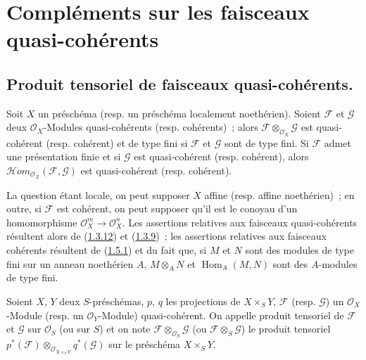 \section{Compléments sur les faisceaux quasi-cohérents}
\label{section:I.9-fr}

\subsection{Produit tensoriel de faisceaux quasi-cohérents.}
\label{subsection:I.9.1-fr}

\begin{proposition}[9.1.1]
\label{I.9.1.1-fr}
Soit $X$ un préschéma (resp. un préschéma localement noethérien). Soient
$\mathscr{F}$ et $\mathscr{G}$ deux $\mathscr{O}_X$-Modules quasi-cohérents
(resp. cohérents)~; alors
$\mathscr{F}\otimes_{\mathscr{O}_X}\mathscr{G}$ est quasi-cohérent (resp.
cohérent) et de type fini si $\mathscr{F}$ et $\mathscr{G}$ sont de type
fini. Si $\mathscr{F}$ admet une présentation finie et si $\mathscr{G}$ est
quasi-cohérent (resp. cohérent), alors
$\mathscr{H}\!om_{\mathscr{O}_X}(\mathscr{F},\mathscr{G})$ est quasi-cohérent
(resp. cohérent).
\end{proposition}

La question étant locale, on peut supposer $X$ affine (resp. affine
noethérien)~; en outre, si $\mathscr{F}$ est cohérent, on peut supposer qu'il
est le conoyau d'un homomorphisme
$\mathscr{O}_X^m\to\mathscr{O}_X^n$. Les assertions relatives aux faisceaux
quasi-cohérents résultent alors de
(\hyperref[I.1.3.12-fr]{1.3.12}) et
(\hyperref[I.1.3.9-fr]{1.3.9})~; les assertions relatives aux faisceaux
cohérents résultent de (\hyperref[I.1.5.1-fr]{1.5.1}) et du fait que, si $M$
et $N$ sont des modules de type fini sur un anneau noethérien $A$,
$M\otimes_A N$ et $\operatorname{Hom}_A(M,N)$ sont des $A$-modules de type
fini.

\begin{definition}[9.1.2]
\label{I.9.1.2-fr}
Soient $X$, $Y$ deux $S$-préschémas, $p$, $q$ les projections de
$X\times_S Y$, $\mathscr{F}$ (resp. $\mathscr{G}$) un
$\mathscr{O}_X$-Module (resp. un $\mathscr{O}_Y$-Module) quasi-cohérent. On
appelle produit tensoriel de $\mathscr{F}$ et $\mathscr{G}$ sur
$\mathscr{O}_S$ (ou sur $S$) et on note
$\mathscr{F}\otimes_{\mathscr{O}_S}\mathscr{G}$ (ou
$\mathscr{F}\otimes_S\mathscr{G}$) le produit tensoriel
$p^*(\mathscr{F})\otimes_{\mathscr{O}_{X\times_S Y}}q^*(\mathscr{G})$ sur le
préschéma $X\times_S Y$.
\end{definition}

